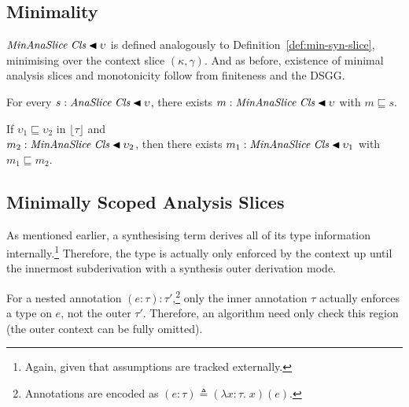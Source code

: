 \subsection{Minimality}
\label{sec:ana-minimality}


$\mathit{MinAnaSlice}\;\mathit{Cls} \mathbin{\blacktriangleleft} \upsilon$ is defined analogously to Definition~\ref{def:min-syn-slice}, minimising over the context slice $(\kappa, \gamma)$. And as before, existence of minimal analysis slices and monotonicity follow from finiteness and the DSGG.

\begin{theorem}\label{thm:ana-min-exists}
For every $s : \mathit{AnaSlice}\;\mathit{Cls} \mathbin{\blacktriangleleft} \upsilon$, there exists $m : \mathit{MinAnaSlice}\;\mathit{Cls} \mathbin{\blacktriangleleft} \upsilon$ with $m \sqsubseteq s$.
\end{theorem}

\begin{theorem}\label{thm:ana-mono}
If $\upsilon_1 \sqsubseteq \upsilon_2$ in $\lfloor\tau\rfloor$ and\\$m_2 : \mathit{MinAnaSlice}\;\mathit{Cls} \mathbin{\blacktriangleleft} \upsilon_2$, then there exists $m_1 : \mathit{MinAnaSlice}\;\mathit{Cls} \mathbin{\blacktriangleleft} \upsilon_1$ with $m_1 \sqsubseteq m_2$.
\end{theorem}

\subsection{Minimally Scoped Analysis Slices}
\noindent As mentioned earlier, a synthesising term derives all of its type information internally.\footnote{Again, given that assumptions are tracked externally.} Therefore, the type is actually only enforced by the context up until the innermost subderivation with a synthesis outer derivation mode.

\begin{exmp} For a nested annotation $(e : \tau) : \tau'$,\footnote{Annotations are encoded as $(e : \tau) \triangleq (\lambda x \mathbin{:} \tau.\; x)(e)$.} only the inner annotation $\tau$ actually enforces a type on $e$, not the outer $\tau'$. Therefore, an algorithm need only check this region (the outer context can be fully omitted).
\end{exmp}

